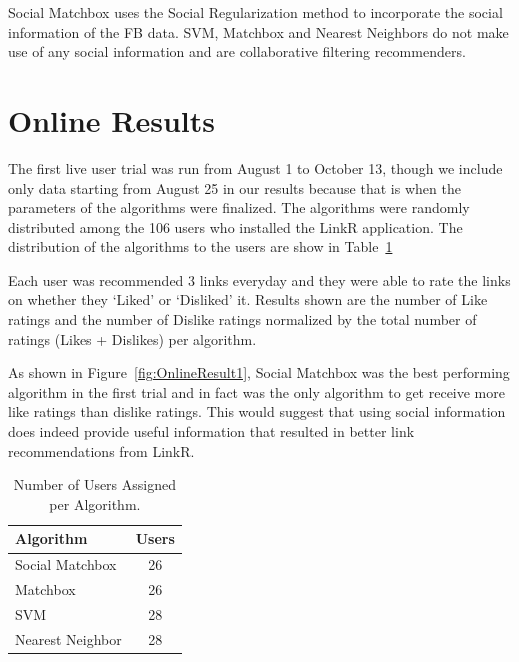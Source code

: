Social Matchbox uses the Social Regularization method to incorporate the social information of the FB data. SVM, Matchbox and Nearest Neighbors do not make use of any social information and are collaborative filtering recommenders.

\section{Online Results}

The first live user trial was run from August 1 to October 13, though we include only data starting from August 25 in our results because that is when the parameters of the algorithms were finalized. The algorithms were randomly distributed among the 106 users who installed the LinkR application. The distribution of the algorithms to the users are show in Table~\ref{tab:Assigned1}

Each user was recommended 3 links everyday and they were able to rate the links on whether they `Liked' or `Disliked' it. Results shown are the number of Like ratings and the number of Dislike ratings normalized by the total number of ratings (Likes + Dislikes) per algorithm. 

As shown in Figure~\ref{fig:OnlineResult1}, Social Matchbox was the best performing algorithm in the first trial and in fact was the only algorithm to get receive more like ratings than dislike ratings. This would suggest that using social information does indeed provide useful information that resulted in better link recommendations from LinkR.

\begin{table}[h!]
\centering
\begin{tabular}{| l | c |}
\hline
{\bf Algorithm} & {\bf Users} \\
\hline
Social Matchbox & 26\\
Matchbox  & 26 \\
SVM & 28 \\
Nearest Neighbor & 28 \\
\hline
\end{tabular}
\caption{Number of Users Assigned per Algorithm.}
\label{tab:Assigned1}
\end{table}

